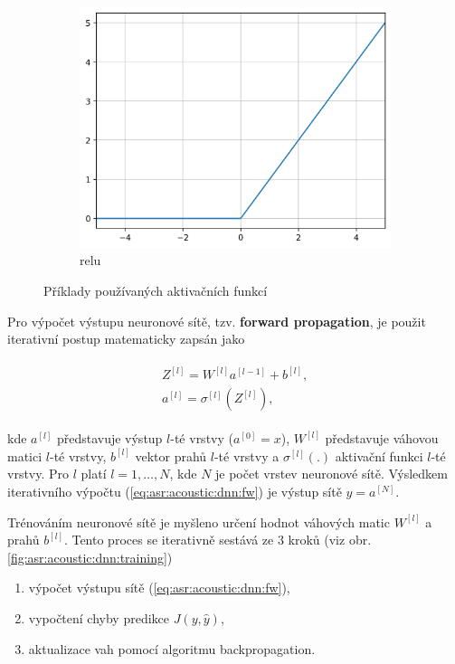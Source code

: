 \begin{figure}[htpb]
\begin{subfigure}[b]{0.28\textwidth}
    \includegraphics[width=\textwidth]{./ch4-asr/img/relu.png}
    \caption{relu}
    \label{fig:asr:acoustic:dnn:activation:relu}
  \end{subfigure}
  \caption{Příklady používaných aktivačních funkcí}
  \label{fig:asr:acoustic:dnn:activation}
\end{figure}

Pro výpočet výstupu neuronové sítě, tzv. \textbf{forward propagation}, je použit iterativní postup matematicky zapsán jako

\begin{align}
  \begin{split}
    Z^{[l]} = W^{[l]}a^{[l-1]} + b^{[l]}, \\
    a^{[l]} = \sigma^{[l]}\left(Z^{[l]}\right),
  \end{split}
  \label{eq:asr:acoustic:dnn:fw}
\end{align}

\noindent kde $a^{[l]}$ představuje výstup $l$-té vrstvy ($a^{[0]} = x$), $W^{[l]}$ představuje váhovou matici $l$-té vrstvy, $b^{[l]}$ vektor prahů $l$-té vrstvy a $\sigma^{[l]}(.)$ aktivační funkci $l$-té vrstvy. Pro $l$ platí $l = 1, \dots, N$, kde $N$ je počet vrstev neuronové sítě. Výsledkem iterativního výpočtu (\ref{eq:asr:acoustic:dnn:fw}) je výstup sítě $y = a^{[N]}$.

Trénováním neuronové sítě je myšleno určení hodnot váhových matic $W^{[l]}$ a prahů $b^{[l]}$. Tento proces se iterativně sestává ze 3 kroků (viz obr. \ref{fig:asr:acoustic:dnn:training})

\begin{enumerate}
  \item výpočet výstupu sítě (\ref{eq:asr:acoustic:dnn:fw}),
  \item vypočtení chyby predikce $J\left(y, \hat{y}\right)$,
  \item aktualizace vah pomocí algoritmu backpropagation.
\end{enumerate}

